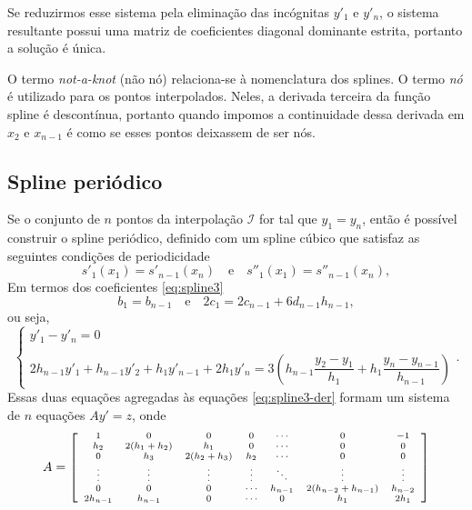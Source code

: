 Se reduzirmos esse sistema pela eliminação das incógnitas $y'_1$ e $y'_n$, o sistema resultante possui uma matriz de coeficientes diagonal dominante estrita, portanto a solução é única.

O termo \textit{not-a-knot} (não nó) relaciona-se à nomenclatura dos splines. O termo \textit{nó} é utilizado para os pontos interpolados. Neles, a derivada terceira da função spline é descontínua, portanto quando impomos a continuidade dessa derivada em $x_2$ e $x_{n-1}$ é como se esses pontos deixassem de ser nós.

\subsection{Spline periódico}
Se o conjunto de $n$ pontos da interpolação $\mathcal{I}$ for tal que $y_1=y_n$, então é possível construir o spline periódico, definido com um spline cúbico que satisfaz as seguintes condições de periodicidade
\begin{equation*}
	s'_1(x_1)=s'_{n-1}(x_n)\quad\text{e}\quad	s''_1(x_1)=s''_{n-1}(x_n),
\end{equation*}
Em termos dos coeficientes \eqref{eq:spline3}
\begin{equation*}
	b_1=b_{n-1}\quad\text{e}\quad 2c_1=2c_{n-1}+6d_{n-1}h_{n-1},
\end{equation*}
ou seja,
\begin{equation}
	\left\{\begin{array}{l}
			y'_1-y'_n=0\\
			\\
			2h_{n-1}y'_1+h_{n-1}y'_2+h_1y'_{n-1}+2h_1y'_n=3\left(h_{n-1}\dfrac{y_2-y_1}{h_1}+h_1\dfrac{y_n-y_{n-1}}{h_{n-1}}\right)
		\end{array}
	\right. .
\end{equation}
Essas duas equações agregadas às equações \eqref{eq:spline3-der} formam um sistema de $n$ equações $Ay' = z$, onde
\begin{equation*}
	\begin{scriptsize}
		A=\left[\begin{array}{ccccccc}
			1&0&0&0&\cdots&0&-1\\
			h_2&2(h_1+h_2)&h_1&0&\cdots&0&0\\
			0&h_3&2(h_2+h_3)&h_2&\cdots&0&0\\
			\vdots&\vdots&\vdots&\vdots&\ddots&\vdots&\vdots\\
			0&0&0&\cdots&h_{n-1} & 2(h_{n-2}+h_{n-1})&h_{n-2}\\
			2h_{n-1}&h_{n-1}&0&\cdots &0&h_1&2h_1
			\end{array}\right] 
	\end{scriptsize} 
\end{equation*}

